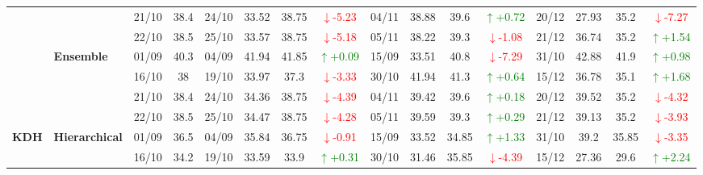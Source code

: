 \documentclass{ieeeaccess}
\begin{document}
{\begin{longtable}{llcc|cccc|cccc|cccc}
& 
& 21/10 & 38.4 & 24/10 & 33.52 & 38.75 & \textcolor{red}{\(\downarrow\)-5.23} & 04/11 & 38.88 & 39.6 & \textcolor{green}{\(\uparrow\)+0.72} & 20/12 & 27.93 & 35.2 & \textcolor{red}{\(\downarrow\)-7.27} \\

&
& 22/10 & 38.5 & 25/10 & 33.57 & 38.75 & \textcolor{red}{\(\downarrow\)-5.18} & 05/11 & 38.22 & 39.3 & \textcolor{red}{\(\downarrow\)-1.08} & 21/12 & 36.74 & 35.2 & \textcolor{green}{\(\uparrow\)+1.54} \\
\cmidrule(lr){2-16}


& \textbf{Ensemble}
& 01/09 & 40.3 & 04/09 & 41.94 & 41.85 & \textcolor{green}{\(\uparrow\)+0.09} & 15/09 & 33.51 & 40.8 & \textcolor{red}{\(\downarrow\)-7.29} & 31/10 & 42.88 & 41.9 & \textcolor{green}{\(\uparrow\)+0.98} \\

& 
& 16/10 & 38 & 19/10 & 33.97 & 37.3 & \textcolor{red}{\(\downarrow\)-3.33} & 30/10 & 41.94 & 41.3 & \textcolor{green}{\(\uparrow\)+0.64} & 15/12 & 36.78 & 35.1 & \textcolor{green}{\(\uparrow\)+1.68} \\

& 
& 21/10 & 38.4 & 24/10 & 34.36 & 38.75 & \textcolor{red}{\(\downarrow\)-4.39} & 04/11 & 39.42 & 39.6 & \textcolor{green}{\(\uparrow\)+0.18} & 20/12 & 39.52 & 35.2 & \textcolor{red}{\(\downarrow\)-4.32} \\

&
& 22/10 & 38.5 & 25/10 & 34.47 & 38.75 & \textcolor{red}{\(\downarrow\)-4.28} & 05/11 & 39.59 & 39.3 & \textcolor{green}{\(\uparrow\)+0.29} & 21/12 & 39.13 & 35.2 & \textcolor{red}{\(\downarrow\)-3.93} \\
\midrule



\multirow{12}{*}{\textbf{KDH}} 
& \textbf{Hierarchical}
& 01/09 & 36.5 & 04/09 & 35.84 & 36.75 & \textcolor{red}{\(\downarrow\)-0.91} & 15/09 & 33.52 & 34.85 & \textcolor{green}{\(\uparrow\)+1.33} & 31/10 & 39.2 & 35.85 & \textcolor{red}{\(\downarrow\)-3.35} \\

&
& 16/10 & 34.2 & 19/10 & 33.59 & 33.9 & \textcolor{green}{\(\uparrow\)+0.31} & 30/10 & 31.46 & 35.85 & \textcolor{red}{\(\downarrow\)-4.39} & 15/12 & 27.36 & 29.6 & \textcolor{green}{\(\uparrow\)+2.24} \\


\end{longtable}}
\end{document}
